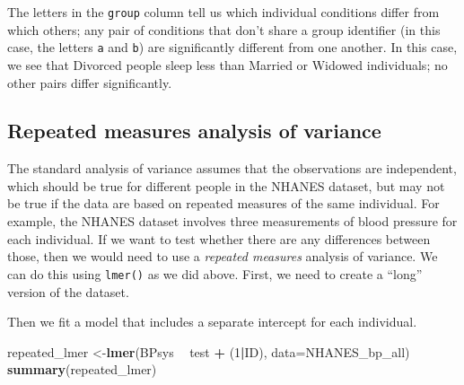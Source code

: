\documentclass[12pt,]{book}
\newenvironment{Shaded}{\begin{snugshade}}{\end{snugshade}}
\newcommand{\DataTypeTok}[1]{\textcolor[rgb]{0.13,0.29,0.53}{#1}}
\newcommand{\DecValTok}[1]{\textcolor[rgb]{0.00,0.00,0.81}{#1}}
\newcommand{\KeywordTok}[1]{\textcolor[rgb]{0.13,0.29,0.53}{\textbf{#1}}}
\newcommand{\NormalTok}[1]{#1}
\newcommand{\OperatorTok}[1]{\textcolor[rgb]{0.81,0.36,0.00}{\textbf{#1}}}
\newcommand{\StringTok}[1]{\textcolor[rgb]{0.31,0.60,0.02}{#1}}
\begin{document}
The letters in the \texttt{group} column tell us which individual conditions differ from which others; any pair of conditions that don't share a group identifier (in this case, the letters \texttt{a} and \texttt{b}) are significantly different from one another. In this case, we see that Divorced people sleep less than Married or Widowed individuals; no other pairs differ significantly.

\hypertarget{repeated-measures-analysis-of-variance}{%
\subsection{Repeated measures analysis of variance}\label{repeated-measures-analysis-of-variance}}

The standard analysis of variance assumes that the observations are independent, which should be true for different people in the NHANES dataset, but may not be true if the data are based on repeated measures of the same individual. For example, the NHANES dataset involves three measurements of blood pressure for each individual. If we want to test whether there are any differences between those, then we would need to use a \emph{repeated measures} analysis of variance. We can do this using \texttt{lmer()} as we did above. First, we need to create a ``long'' version of the dataset.

\begin{Shaded}
\end{Shaded}

Then we fit a model that includes a separate intercept for each individual.

\begin{Shaded}
\begin{Highlighting}[]
\NormalTok{repeated_lmer <-}\KeywordTok{lmer}\NormalTok{(BPsys }\OperatorTok{~}\StringTok{ }\NormalTok{test }\OperatorTok{+}\StringTok{ }\NormalTok{(}\DecValTok{1}\OperatorTok{|}\NormalTok{ID), }\DataTypeTok{data=}\NormalTok{NHANES_bp_all)}
\KeywordTok{summary}\NormalTok{(repeated_lmer)}
\end{Highlighting}
\end{Shaded}
\end{document}
